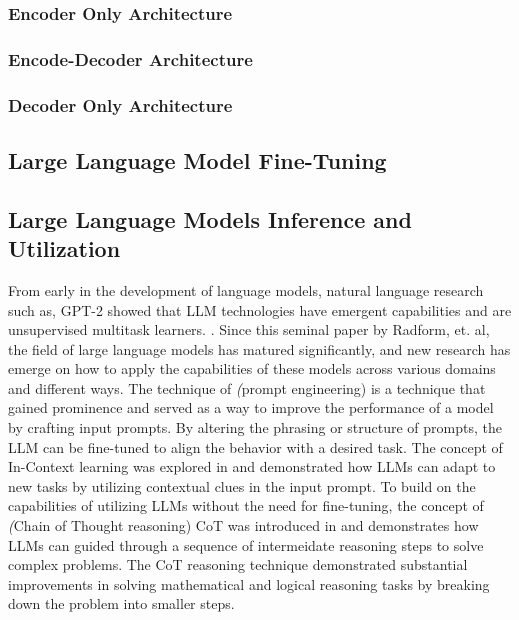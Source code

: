 \subsubsection{Encoder Only Architecture}

\subsubsection{Encode-Decoder Architecture}

\subsubsection{Decoder Only Architecture}

\subsection{Large Language Model Fine-Tuning}

\subsection{Large Language Models Inference and Utilization}

From early in the development of language models, natural language research such as, GPT-2 showed that LLM technologies have emergent capabilities and are unsupervised multitask learners. \cite{radford2019language}. Since this seminal paper by Radform, et. al, the field of large language models has matured significantly, and new research has emerge on how to apply the capabilities of these models across various domains and different ways. The technique of \textit(prompt engineering) is a technique that gained prominence and served as a way to improve the performance of a model by crafting input prompts. By altering the phrasing or structure of prompts, the LLM can be fine-tuned to align the behavior with a desired task. \cite{liu2023pre} The concept of In-Context learning was explored in \cite{brown2020language} and demonstrated how LLMs can adapt to new tasks by utilizing contextual clues in the input prompt. To build on the capabilities of utilizing LLMs without the need for fine-tuning, the concept of \textit(Chain of Thought reasoning) CoT was introduced in \cite{huang2023language} and demonstrates how LLMs can guided through a sequence of intermeidate reasoning steps to solve complex problems. The CoT reasoning technique demonstrated substantial improvements in solving mathematical and logical reasoning tasks by breaking down the problem into smaller steps.


